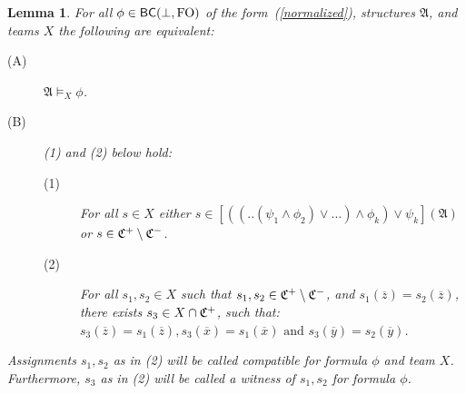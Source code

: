 \documentclass{article}
\theoremstyle{plain}
\newtheorem{lemma}[theorem]{Lemma}
\theoremstyle{definition}
\newcommand{\mA}{{\mathfrak A}}
\newcommand{\tu}[1]{\overline{#1}}
\begin{document}
\begin{lemma}\label{bcindepfo}
For all $\phi\in\mathsf{BC}(\bot,{\rm FO})$ of the form~(\ref{normalized}), structures $\mA$,  and teams $X$  the following are equivalent:
\begin{description}
\item [(A)]$\mA\models_X\phi$.
\item [(B)] (1) and (2) below hold: 
\begin{description}

\item[(1)] For all $s\in X$ either $s\in [((..(\psi_1\wedge \phi_2) \vee \dots ) \wedge \phi_k) \vee \psi_k](\mA)$ or $s\in\mathfrak{C}^{+}\setminus\mathfrak{C}^{-}$. 

\item[(2)]\label{c2}  For all $s_1,s_2\in X$ such that $s_1,s_2\in \mathfrak{C}^{+}\setminus \mathfrak{C}^{-}$, and $s_1(\tu z)=s_2(\tu z)$,   there exists $s_3\in  X\cap \mathfrak{C}^{+}$,
such that: $s_3(\tu z)=s_1(\tu z), s_3(\tu x)=s_1(\tu x) \mbox{ and } s_3(\tu y)=s_2(\tu y)$. 




\end{description}

\end{description}Assignments  $s_1,s_2$ as in (2) will be called \textit{compatible} for formula $\phi$ and team $X$. Furthermore, $s_3$ as in (2) will be called a \textit{witness} of $s_1,s_2$ for formula $\phi$.
\end{lemma}
\end{document}
